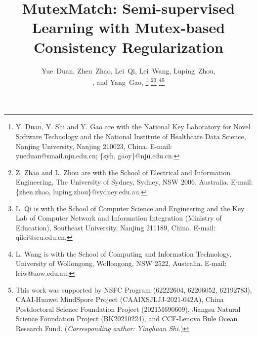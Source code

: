 \documentclass[lettersize,journal]{IEEEtran}
\theoremstyle{plain}
\theoremstyle{definition}
\theoremstyle{remark}
\begin{document}
\title{MutexMatch: Semi-supervised Learning with Mutex-based Consistency Regularization}



\author{Yue~Duan,
        Zhen~Zhao,
        Lei~Qi,
        Lei~Wang, 
        Luping~Zhou, \\
        , and
        Yang~Gao, \thanks{
Y. Duan, Y. Shi and Y. Gao are with the National Key Laboratory for Novel Software Technology and the National Institute of Healthcare Data Science, Nanjing University, Nanjing 210023, China. E-mail: yueduan@smail.nju.edu.cn; 
\{syh, gaoy\}@nju.edu.cn. }
\thanks{
Z. Zhao and L. Zhou are with the School of Electrical and Information Engineering, The University of Sydney, Sydney, NSW 2006, Australia. E-mail:
\{zhen.zhao, luping.zhou\}@sydney.edu.au.}\thanks{
L. Qi is with the School of Computer Science and Engineering and
the Key Lab of Computer Network and Information Integration (Ministry of Education), Southeast University, Nanjing 211189, China. E-mail: qilei@seu.edu.cn.}
\thanks{L. Wang is with the School of Computing and
Information Technology, University of Wollongong, Wollongong, NSW
2522, Australia. E-mail: leiw@uow.edu.au.}\thanks{This work was supported by NSFC Program (62222604, 62206052, 62192783), CAAI-Huawei MindSpore Project (CAAIXSJLJJ-2021-042A), China Postdoctoral Science Foundation Project (2021M690609), Jiangsu Natural Science Foundation Project (BK20210224), and CCF-Lenovo Bule Ocean Research Fund. (\textit{Corresponding author: Yinghuan Shi.})}
}




\maketitle
\end{document}
